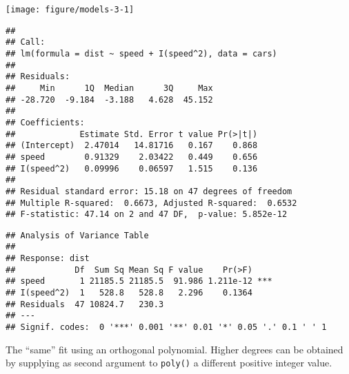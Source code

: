 \begin{knitrout}
\color{fgcolor}\begin{kframe}
\begin{alltt}
 \hlkwb{<-}  \hlopt{~}  \hlopt{+} \hlopt{^}\hlstd{),}  
  \hlstd{=} \hlstd{)} 
\end{alltt}
\end{kframe}
\texttt{[image: figure/models-3-1]} 
\begin{kframe}\begin{alltt}
 
\end{alltt}
\begin{verbatim}
## 
## Call:
## lm(formula = dist ~ speed + I(speed^2), data = cars)
## 
## Residuals:
##     Min      1Q  Median      3Q     Max 
## -28.720  -9.184  -3.188   4.628  45.152 
## 
## Coefficients:
##             Estimate Std. Error t value Pr(>|t|)
## (Intercept)  2.47014   14.81716   0.167    0.868
## speed        0.91329    2.03422   0.449    0.656
## I(speed^2)   0.09996    0.06597   1.515    0.136
## 
## Residual standard error: 15.18 on 47 degrees of freedom
## Multiple R-squared:  0.6673,	Adjusted R-squared:  0.6532 
## F-statistic: 47.14 on 2 and 47 DF,  p-value: 5.852e-12
\end{verbatim}
\begin{alltt}
 
\end{alltt}
\begin{verbatim}
## Analysis of Variance Table
## 
## Response: dist
##            Df  Sum Sq Mean Sq F value    Pr(>F)    
## speed       1 21185.5 21185.5  91.986 1.211e-12 ***
## I(speed^2)  1   528.8   528.8   2.296    0.1364    
## Residuals  47 10824.7   230.3                      
## ---
## Signif. codes:  0 '***' 0.001 '**' 0.01 '*' 0.05 '.' 0.1 ' ' 1
\end{verbatim}
\end{kframe}
\end{knitrout}

The ``same'' fit using an orthogonal polynomial. Higher degrees can be obtained by supplying as second argument to \texttt{poly()} a different positive integer value.

